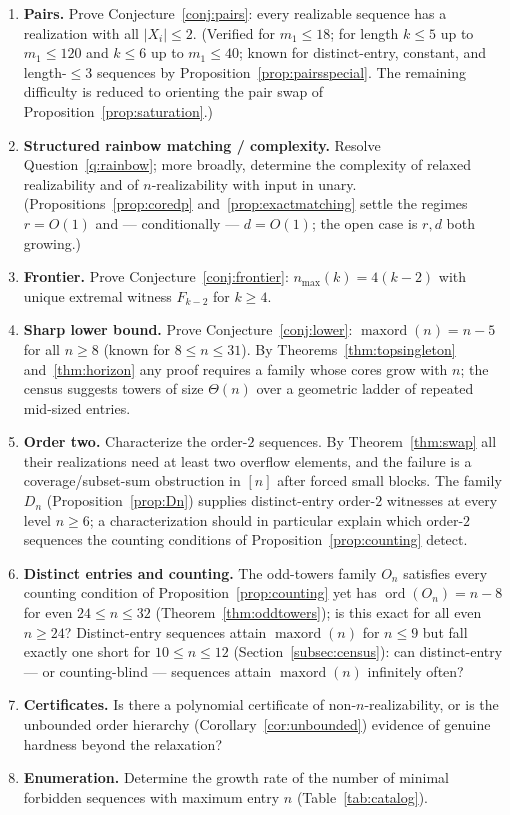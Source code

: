 \documentclass[11pt]{article}
\theoremstyle{definition}
\theoremstyle{remark}
\newcommand{\ord}{\operatorname{ord}}
\newcommand{\maxord}{\operatorname{maxord}}
\newcommand{\intv}[1]{[#1]}
\begin{document}
\begin{enumerate}[itemsep=2pt]
\item \textbf{Pairs.} Prove Conjecture~\ref{conj:pairs}: every realizable sequence
has a realization with all $|X_i|\le2$. (Verified for $m_1\le18$; for length
$k\le5$ up to $m_1\le120$ and $k\le6$ up to $m_1\le40$; known for distinct-entry,
constant, and length-$\le3$ sequences by Proposition~\ref{prop:pairsspecial}.
The remaining difficulty is reduced to orienting the pair swap of
Proposition~\ref{prop:saturation}.)
\item \textbf{Structured rainbow matching / complexity.} Resolve
Question~\ref{q:rainbow}; more broadly, determine the complexity of relaxed
realizability and of $n$-realizability with input in unary.
(Propositions~\ref{prop:coredp} and~\ref{prop:exactmatching} settle the regimes
$r=O(1)$ and --- conditionally --- $d=O(1)$; the open case is $r,d$ both
growing.)
\item \textbf{Frontier.} Prove Conjecture~\ref{conj:frontier}:
$n_{\max}(k)=4(k-2)$ with unique extremal witness $F_{k-2}$ for $k\ge4$.
\item \textbf{Sharp lower bound.} Prove Conjecture~\ref{conj:lower}:
$\maxord(n)=n-5$ for all $n\ge8$ (known for $8\le n\le31$).
By Theorems~\ref{thm:topsingleton}
and~\ref{thm:horizon} any proof requires a family whose cores grow with $n$; the
census suggests towers of size $\Theta(n)$ over a geometric ladder of repeated
mid-sized entries.
\item \textbf{Order two.} Characterize the order-$2$ sequences. By
Theorem~\ref{thm:swap} all their realizations need at least two overflow elements,
and the failure is a coverage/subset-sum obstruction in $\intv n$ after forced
small blocks. The family $D_n$ (Proposition~\ref{prop:Dn}) supplies distinct-entry
order-$2$ witnesses at every level $n\ge6$; a characterization should in particular
explain which order-$2$ sequences the counting conditions of
Proposition~\ref{prop:counting} detect.
\item \textbf{Distinct entries and counting.} The odd-towers family $O_n$
satisfies every counting condition of Proposition~\ref{prop:counting} yet has
$\ord(O_n)=n-8$ for even $24\le n\le32$ (Theorem~\ref{thm:oddtowers}); is this
exact for all even $n\ge24$? Distinct-entry sequences attain $\maxord(n)$ for
$n\le9$ but fall exactly one short for $10\le n\le12$
(Section~\ref{subsec:census}): can distinct-entry --- or counting-blind ---
sequences attain $\maxord(n)$ infinitely often?
\item \textbf{Certificates.} Is there a polynomial certificate of
non-$n$-realizability, or is the unbounded order hierarchy
(Corollary~\ref{cor:unbounded}) evidence of genuine hardness beyond the
relaxation?
\item \textbf{Enumeration.} Determine the growth rate of the number of minimal
forbidden sequences with maximum entry $n$ (Table~\ref{tab:catalog}).
\end{enumerate}
\end{document}
